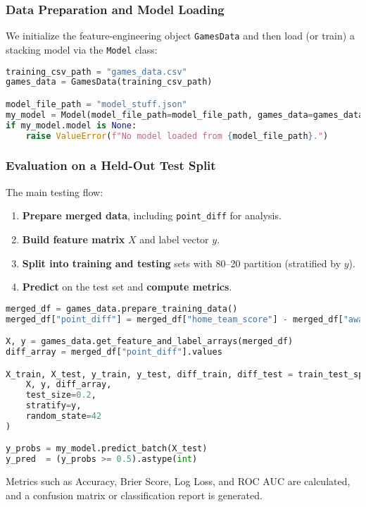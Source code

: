\documentclass[12pt]{article}
\begin{document}
\subsubsection{Data Preparation and Model Loading}
We initialize the feature-engineering object \texttt{GamesData} and then load (or train) a stacking model via the \texttt{Model} class:
\begin{lstlisting}[language=Python]
training_csv_path = "games_data.csv"
games_data = GamesData(training_csv_path)

model_file_path = "model_stuff.json"
my_model = Model(model_file_path=model_file_path, games_data=games_data)
if my_model.model is None:
    raise ValueError(f"No model loaded from {model_file_path}.")
\end{lstlisting}

\subsubsection{Evaluation on a Held-Out Test Split}
The main testing flow:
\begin{enumerate}[label=\arabic*)]
    \item \textbf{Prepare merged data}, including \texttt{point\_diff} for analysis.
    \item \textbf{Build feature matrix} \(X\) and label vector \(y\).
    \item \textbf{Split into training and testing} sets with 80--20 partition (stratified by \(y\)).
    \item \textbf{Predict} on the test set and \textbf{compute metrics}.
\end{enumerate}

\begin{lstlisting}[language=Python]
merged_df = games_data.prepare_training_data()
merged_df["point_diff"] = merged_df["home_team_score"] - merged_df["away_team_score"]

X, y = games_data.get_feature_and_label_arrays(merged_df)
diff_array = merged_df["point_diff"].values

X_train, X_test, y_train, y_test, diff_train, diff_test = train_test_split(
    X, y, diff_array,
    test_size=0.2,
    stratify=y,
    random_state=42
)

y_probs = my_model.predict_batch(X_test)
y_pred  = (y_probs >= 0.5).astype(int)
\end{lstlisting}

\noindent
Metrics such as Accuracy, Brier Score, Log Loss, and ROC AUC are calculated, and a confusion matrix or classification report is generated.
\end{document}
